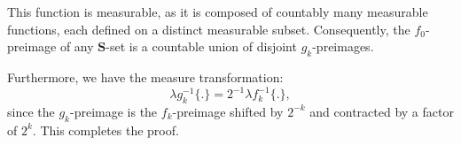    This function is measurable, as it is composed of countably many measurable functions, each defined on a distinct measurable subset. Consequently, the $f_0$-preimage of any $\mathbf{S}$-set is a countable union of disjoint $g_k$-preimages. 

    Furthermore, we have the measure transformation:
    \[
    \lambda g_k^{-1}\{.\} = 2^{-1} \lambda f_k^{-1}\{.\},
    \]
    since the $g_k$-preimage is the $f_k$-preimage shifted by $2^{-k}$ and contracted by a factor of $2^k$. This completes the proof.
